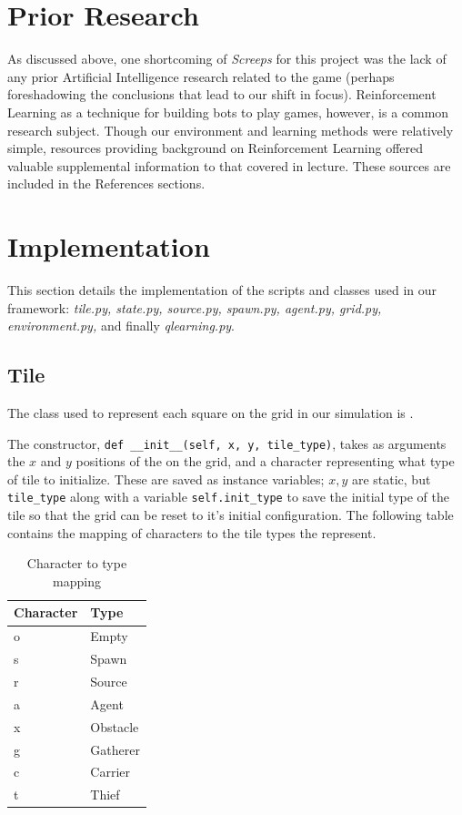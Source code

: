 \documentclass[11pt]{article}
\begin{document}
\section{Prior Research}

As discussed above, one shortcoming of \textit{Screeps} for this project was the lack of any prior Artificial Intelligence research related to the game (perhaps foreshadowing the conclusions that lead to our shift in focus). Reinforcement Learning as a technique for building bots to play games, however, is a common research subject. Though our environment and learning methods were relatively simple, resources providing background on Reinforcement Learning offered valuable supplemental information to that covered in lecture. These sources are included in the References sections.

\section{Implementation}

This section details the implementation of the scripts and classes used in our framework: \textit{tile.py, state.py, source.py, spawn.py, agent.py, grid.py, environment.py,} and finally \textit{qlearning.py}.

\subsection{Tile}

The class used to represent each square on the grid in our simulation is .

The constructor, \texttt{def __init__(self, x, y, tile_type)}, takes as arguments the $x$ and $y$ positions of the  on the grid, and a character representing what type of tile to initialize. These are saved as instance variables; $x, y$ are static, but \texttt{tile_type} along with a variable \texttt{self.init_type} to save the initial type of the tile so that the grid can be reset to it's initial configuration. The following table contains the mapping of characters to the tile types the represent.

\begin{table}[h]
\centering
\caption{Character to type mapping}
\begin{tabular}{|l|l|}
\hline
Character & Type \\ \hline
o & Empty \\ \hline
s & Spawn \\ \hline
r & Source \\ \hline
a & Agent \\ \hline
x & Obstacle \\ \hline
g & Gatherer \\ \hline
c & Carrier \\ \hline
t & Thief \\ \hline
\end{tabular}
\end{table}
\end{document}
